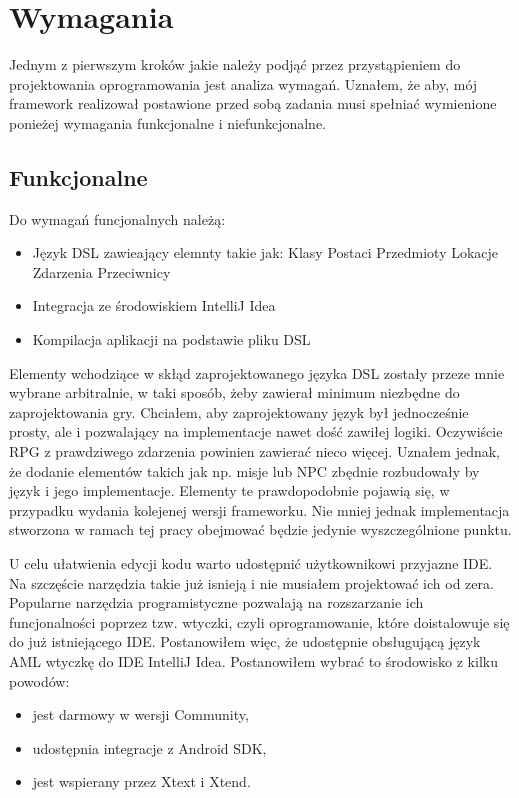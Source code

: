 \documentclass	{xmgr}
\begin{document}
\chapter{Wymagania}

Jednym z pierwszym kroków jakie należy podjąć przez przystąpieniem do projektowania oprogramowania jest analiza wymagań. Uznałem, że aby, mój framework realizował postawione przed sobą zadania musi spełniać wymienione ponieżej wymagania funkcjonalne i niefunkcjonalne.

\section{Funkcjonalne}
Do wymagań funcjonalnych należą:
\begin{itemize}
\item Język DSL zawieający elemnty takie jak:
\subitem Klasy Postaci
\subitem Przedmioty
\subitem Lokacje
\subitem Zdarzenia
\subitem Przeciwnicy
\item Integracja ze środowiskiem IntelliJ Idea
\item Kompilacja aplikacji na podstawie pliku DSL 
\end{itemize}

Elementy wchodziące w skłąd zaprojektowanego języka DSL zostały przeze mnie wybrane arbitralnie, w taki sposób, żeby zawierał minimum niezbędne do zaprojektowania gry.  Chciałem, aby zaprojektowany język był jednocześnie prosty, ale i pozwalający na implementacje nawet dość zawiłej logiki. Oczywiście RPG z prawdziwego zdarzenia powinien zawierać nieco więcej. Uznałem jednak, że dodanie elementów takich jak np. misje lub NPC zbędnie rozbudowały by język i jego implementacje. Elementy te prawdopodobnie pojawią się, w przypadku wydania kolejenej wersji frameworku. Nie mniej jednak implementacja stworzona w ramach tej pracy obejmować będzie jedynie wyszczególnione punktu.

U celu ułatwienia edycji kodu warto udostępnić użytkownikowi przyjazne IDE. Na szczęście narzędzia takie już isnieją i nie musiałem projektować ich od zera. Popularne narzędzia programistyczne pozwalają na rozszarzanie ich funcjonalności poprzez tzw. wtyczki, czyli oprogramowanie, które doistalowuje się do już istniejącego IDE. Postanowiłem więc, że udostępnie obsługującą język AML wtyczkę do IDE IntelliJ Idea. Postanowiłem wybrać to środowisko z kilku powodów:
\begin{itemize}	
\item jest darmowy w wersji Community,
\item udostępnia integracje z Android SDK,
\item jest wspierany przez Xtext i Xtend.
\end{itemize}
\end{document}
